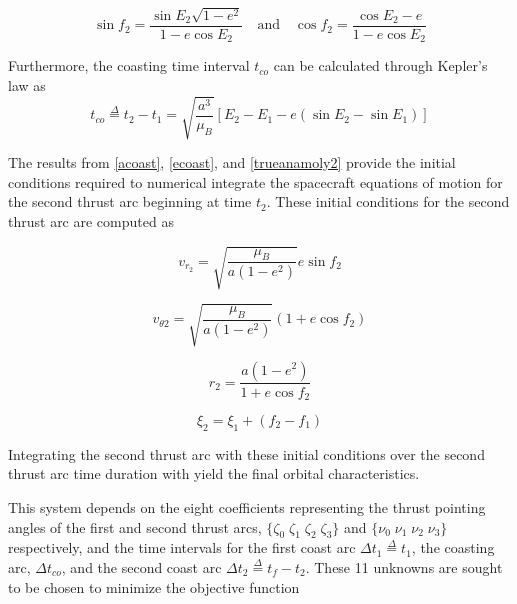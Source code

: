 \begin{equation}
\sin{f_2} = \dfrac{\sin{E_2}\sqrt{1-e^2}}{1-e\cos{E_2}} \quad \text{and} \quad
\cos{f_2} = \dfrac{\cos{E_2}-e}{1-e\cos{E_2}}
\label{trueanamoly2}
\end{equation}

\noindent Furthermore, the coasting time interval $t_{co}$ can be calculated through Kepler's law as
\begin{equation}
t_{co} \overset{\Delta}{=} t_2 - t_1 = \sqrt{\dfrac{a^3}{\mu_B}}[E_2-E_1-e(\sin{E_2}-\sin{E_1})]
\end{equation}

\noindent The results from \ref{acoast}, \ref{ecoast}, and \ref{trueanamoly2} provide the initial conditions required to numerical integrate 
the spacecraft equations of motion for the second thrust arc beginning at time $t_2$. These initial conditions for the second thrust arc are computed as

\begin{equation}
v_{r_2} = \sqrt{\dfrac{\mu_B}{a(1-e^2)}}e\sin{f_2}
\label{vr2}
\end{equation}

\begin{equation}
    v_{\theta2} = \sqrt{\dfrac{\mu_B}{a(1-e^2)}}(1+e\cos{f_2})
    \label{vtheta2}
\end{equation}

\begin{equation}
r_2 = \dfrac{a(1-e^2)}{1+e\cos{f_2}}
\label{r2}
\end{equation}

\begin{equation}
\xi_2 = \xi_1 + (f_2-f_1)
\end{equation}

\noindent Integrating the second thrust arc with these initial conditions over the second thrust arc time duration with yield the final orbital characteristics. \newline

This system depends on the eight coefficients representing the thrust pointing angles of the first and second thrust arcs, 
$\{\zeta_0 \; \zeta_1 \; \zeta_2 \; \zeta_3 \}$ and $\{\nu_0 \; \nu_1 \; \nu_2 \; \nu_3 \}$ respectively, and the time intervals for the first coast arc
$\Delta t_1 \overset{\Delta}{=} t_1$, the coasting arc, $\Delta t_{co}$, and the second coast arc $\Delta t_2 \overset{\Delta}{=} t_f-t_2 $. These 11 unknowns are sought to be chosen to minimize the objective function 

